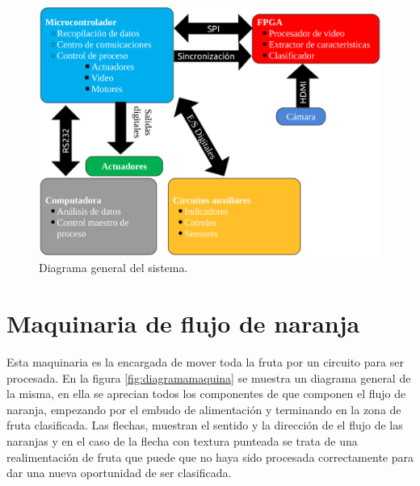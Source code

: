 \documentclass[twoside,spanish,ESP,MSc]{plantillaLabUPV}
\theoremstyle{definition}
\begin{document}
\begin{figure}[h]
	\centering
	\includegraphics*[scale=0.5]{sis} 
	\caption{Diagrama general del sistema.}
	\label{sis}
\end{figure}


\section{Maquinaria de flujo de naranja}
Esta maquinaria es la encargada de mover toda la fruta por un circuito para ser procesada. En la figura \ref{fig:diagramamaquina} se muestra un diagrama general de la misma, en ella se aprecian todos los componentes de que componen el flujo de naranja, empezando por el embudo de alimentación y terminando en la zona de fruta clasificada. Las flechas, muestran el sentido y la dirección de el flujo de las naranjas y en el caso de la flecha con textura punteada se trata de una realimentación de fruta que puede que no haya sido procesada correctamente para dar una nueva oportunidad de ser clasificada.  
\end{document}
